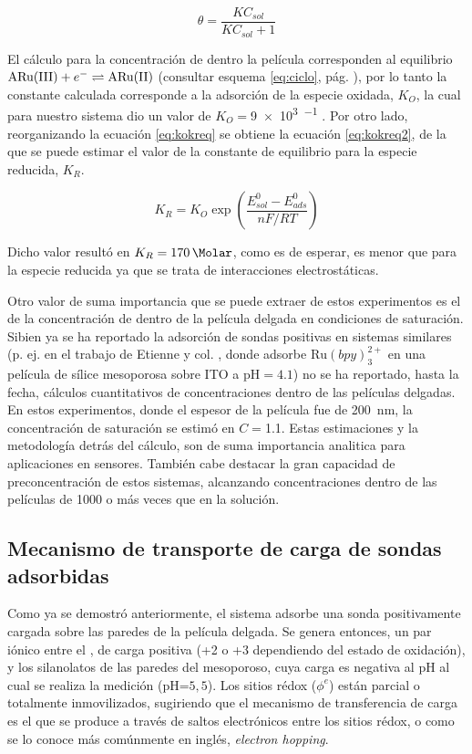 			\begin{equation}
				\theta = \frac{K C_{sol}}{K C_{sol}+1}
				\label{eq:langmuir}
			\end{equation}

		
		El cálculo para la concentración de \ru\space dentro la película corresponden al equilibrio $\text{\ru(III)} + e^- \rightleftharpoons \text{\ru(II)}$ (consultar esquema \ref{eq:ciclo}, pág. \pageref{eq:ciclo}), por lo tanto la constante calculada corresponde a la adsorción de la especie oxidada, $K_O$, la cual para nuestro sistema dio un valor de $K_O=$\SI{9e3}{\Molar^{-1}} . Por otro lado, reorganizando la ecuación \ref{eq:kokreq} se obtiene la ecuación \ref{eq:kokreq2}, de la que se puede estimar el valor de la constante de equilibrio para la especie reducida, $K_R$. 
	
		\begin{equation}
				K_R=K_O \exp\left({\frac{E^0_{sol}-E^0_{ads}}{nF/RT}}\right)
				\label{eq:kokreq2}
		\end{equation}

		Dicho valor resultó en $K_R=\SI{170}{\per\Molar}$, como es de esperar, es menor que para la especie reducida ya que se trata de interacciones electrostáticas. 

		Otro valor de suma importancia que se puede extraer de estos experimentos es el de la concentración de \ru\space dentro de la película delgada en condiciones de saturación. Si\space bien ya se ha reportado la adsorción de sondas positivas en sistemas similares (p. ej. en el trabajo de Etienne y col. \cite{Etienne2007}, donde adsorbe $\text{Ru}(bpy)_3^{2+}$ en una película de sílice mesoporosa sobre ITO a $\text{pH}=4.1$) no se ha reportado, hasta la fecha, cálculos cuantitativos de concentraciones dentro de las películas delgadas. En estos experimentos, donde el espesor de la película fue de \SI{200}{nm}, la concentración de saturación se estimó en $C\!=$\SI{1.1}{\Molar}. Estas estimaciones y la metodología detrás del cálculo, son de suma importancia analitica para aplicaciones en sensores. También cabe destacar la gran capacidad de preconcentración de estos sistemas, alcanzando concentraciones dentro de las películas de 1000 o más veces que en la solución.
		
	\subsection{Mecanismo de transporte de carga de sondas adsorbidas}

	 	 Como ya se demostró anteriormente, el sistema adsorbe una sonda positivamente cargada sobre las paredes de la película delgada. Se genera entonces, un par iónico entre el \ru, de carga positiva (+2 o +3 dependiendo del estado de oxidación), y los silanolatos de las paredes del mesoporoso, cuya carga es negativa al pH al cual se realiza la medición (pH=$5,5$). Los sitios rédox ($\phi^{e}$) están parcial o totalmente inmovilizados, sugiriendo que el mecanismo de transferencia de carga es el que se produce a través de saltos electrónicos entre los sitios rédox, o como se lo conoce más comúnmente en inglés, \textit{electron hopping}. \cite{Rohlfing2005,Vila2015,Audebert2015}

